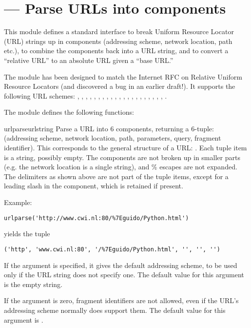 \section{ ---
         Parse URLs into components}




This module defines a standard interface to break Uniform Resource
Locator (URL) strings up in components (addressing scheme, network
location, path etc.), to combine the components back into a URL
string, and to convert a ``relative URL'' to an absolute URL given a
``base URL.''

The module has been designed to match the Internet RFC on Relative
Uniform Resource Locators (and discovered a bug in an earlier
draft!). It supports the following URL schemes:
, , , , , 
, , , , , 
, , , , , 
, , , , , 
, .

The  module defines the following functions:

\begin{funcdesc}{urlparse}{urlstring}
Parse a URL into 6 components, returning a 6-tuple: (addressing
scheme, network location, path, parameters, query, fragment
identifier).  This corresponds to the general structure of a URL:
.
Each tuple item is a string, possibly empty.
The components are not broken up in smaller parts (e.g. the network
location is a single string), and \% escapes are not expanded.
The delimiters as shown above are not part of the tuple items,
except for a leading slash in the  component, which is
retained if present.

Example:

\begin{verbatim}
urlparse('http://www.cwi.nl:80/%7Eguido/Python.html')
\end{verbatim}

yields the tuple

\begin{verbatim}
('http', 'www.cwi.nl:80', '/%7Eguido/Python.html', '', '', '')
\end{verbatim}

If the  argument is specified, it gives the
default addressing scheme, to be used only if the URL string does not
specify one.  The default value for this argument is the empty string.

If the  argument is zero, fragment identifiers
are not allowed, even if the URL's addressing scheme normally does
support them.  The default value for this argument is .
\end{funcdesc}

